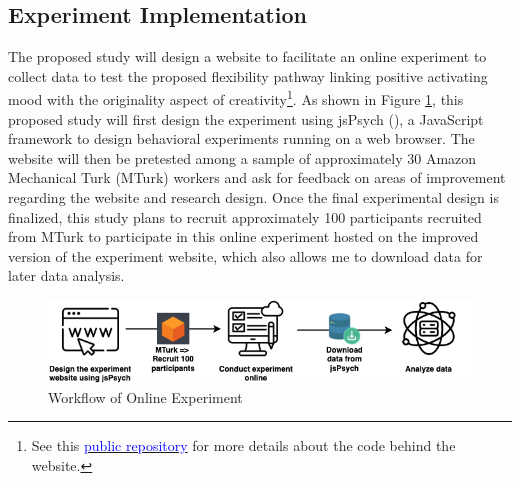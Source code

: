 \documentclass[../Proposal_Writing_Sample.tex]{subfiles}
\begin{document}
\subsection*{Experiment Implementation}
The proposed study will design a website to facilitate an online experiment to collect data to test the proposed flexibility pathway linking positive activating mood with the originality aspect of creativity\footnote{See this \href{https://github.com/cty20010831/incomplete_drawing_task}{\textcolor{blue}{public repository}} for more details about the code behind the website.}. As shown in Figure \ref{fig: Workflow of Online Experiment}, this proposed study will first design the experiment using jsPsych (\cite{leeuw_jspsych_2023}), a JavaScript framework to design behavioral experiments running on a web browser. The website will then be pretested among a sample of approximately 30 Amazon Mechanical Turk (MTurk) workers and ask for feedback on areas of improvement regarding the website and research design. Once the final experimental design is finalized, this study plans to recruit approximately 100 participants recruited from MTurk to participate in this online experiment hosted on the improved version of the experiment website, which also allows me to download data for later data analysis.

\begin{figure}
    \centering
    \includegraphics[width=0.8\linewidth, keepaspectratio]{drawio/Workflow.png}
    \caption{Workflow of Online Experiment}
    \label{fig: Workflow of Online Experiment}
\end{figure}
\end{document}
